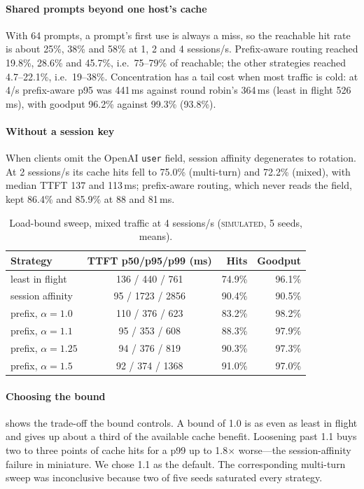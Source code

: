 \documentclass[conference,letterpaper]{IEEEtran}
\newcommand{\code}[1]{\texttt{\small #1}}
\newcommand{\ev}[1]{{\normalfont\textsc{#1}}}
\newcommand{\Simulated}{\ev{simulated}}
\begin{document}
\paragraph*{Shared prompts beyond one host's cache}
With 64 prompts, a prompt's first use is always a miss, so the reachable hit rate is about 25\%,
38\% and 58\% at 1, 2 and 4 sessions/s. Prefix-aware routing reached 19.8\%, 28.6\% and 45.7\%,
i.e.\ 75--79\% of reachable; the other strategies reached 4.7--22.1\%, i.e.\ 19--38\%.
Concentration has a tail cost when most traffic is cold: at 4/s prefix-aware p95 was 441\,ms
against round robin's 364\,ms (least in flight 526\,ms), with goodput 96.2\% against 99.3\%
(93.8\%).

\paragraph*{Without a session key}
When clients omit the OpenAI \code{user} field, session affinity degenerates to rotation. At 2
sessions/s its cache hits fell to 75.0\% (multi-turn) and 72.2\% (mixed), with median TTFT 137
and 113\,ms; prefix-aware routing, which never reads the field, kept 86.4\% and 85.9\% at 88 and
81\,ms.

\begin{table}[t]
\centering
\caption{Load-bound sweep, mixed traffic at 4 sessions/s (\Simulated{}, 5 seeds, means).}
\label{tab:bound}
\footnotesize
\begin{tabular}{@{}l c r r@{}}
\toprule
Strategy & TTFT p50/p95/p99 (ms) & Hits & Goodput \\
\midrule
least in flight & 136 / 440 / 761 & 74.9\% & 96.1\% \\
session affinity & 95 / 1723 / 2856 & 90.4\% & 90.5\% \\
prefix, $\alpha{=}1.0$ & 110 / 376 / 623 & 83.2\% & 98.2\% \\
prefix, $\alpha{=}1.1$ & 95 / 353 / 608 & 88.3\% & 97.9\% \\
prefix, $\alpha{=}1.25$ & 94 / 376 / 819 & 90.3\% & 97.3\% \\
prefix, $\alpha{=}1.5$ & 92 / 374 / 1368 & 91.0\% & 97.0\% \\
\bottomrule
\end{tabular}
\end{table}

\paragraph*{Choosing the bound}
 shows the trade-off the bound controls. A bound of 1.0 is
as even as least in flight and gives up about a third of the available cache benefit.
Loosening past 1.1 buys two to three points of cache hits for a p99 up to 1.8$\times$
worse---the session-affinity failure in miniature. We chose 1.1 as the default. The
corresponding multi-turn sweep was inconclusive because two of five seeds saturated every
strategy.
\end{document}
